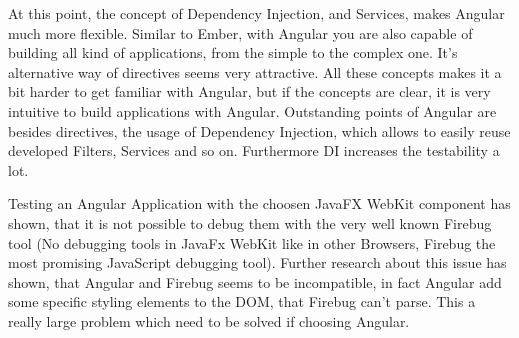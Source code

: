 At this point, the concept of Dependency Injection, and Services, makes Angular much more flexible. Similar to Ember, with Angular you are also capable of building all kind of applications, from the simple to the complex one. It's alternative way of directives seems very attractive. All these concepts makes it a bit harder to get familiar with Angular, but if the concepts are clear, it is very intuitive to build applications with Angular. Outstanding points of Angular are besides directives, the usage of Dependency Injection, which allows to easily reuse developed Filters, Services and so on. Furthermore DI increases the testability a lot. 


Testing an Angular Application with the choosen JavaFX WebKit component has shown, that it is not possible to debug them with the very well known Firebug tool (No debugging tools in JavaFx WebKit like in other Browsers, Firebug the most promising JavaScript debugging tool). Further research about this issue has shown, that Angular and Firebug seems to be incompatible, in fact Angular add some specific styling elements to the DOM, that Firebug can't parse. This a really large problem which need to be solved if choosing Angular.   

